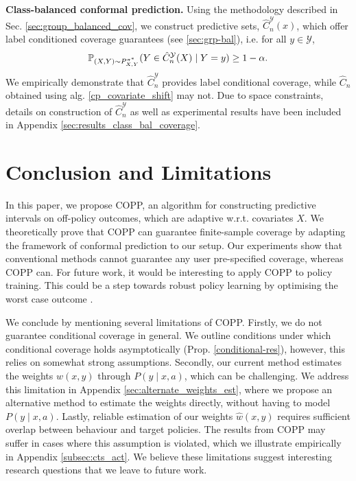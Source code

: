 
\textbf{Class-balanced conformal prediction.}
Using the methodology described in Sec. \ref{sec:group_balanced_cov}, we construct predictive sets, $\hat{C}^{\mathcal{Y}}_n(x)$, which offer label conditioned coverage guarantees (see \ref{sec:grp-bal}), i.e. for all $y\in \mathcal{Y}$, 
$$
\mathbb{P}_{(X,Y)\sim P^{\pi^*}_{X,Y}}(Y \in \hat{C}^{\mathcal{Y}}_n(X) \mid Y = y) \geq 1- \alpha.
$$
We empirically demonstrate that $\hat{C}^{\mathcal{Y}}_n$ provides label conditional coverage, while $\hat{C}_n$ obtained using alg. \ref{cp_covariate_shift} may not. Due to space constraints, details on construction of $\hat{C}^{\mathcal{Y}}_n$ as well as experimental results have been included in Appendix \ref{sec:results_class_bal_coverage}.

\section{Conclusion and Limitations}\label{sec:lims}

In this paper, we propose COPP, an algorithm for constructing predictive intervals on off-policy outcomes, which are adaptive w.r.t. covariates $X$. We theoretically prove that COPP can guarantee finite-sample coverage by adapting the framework of conformal prediction to our setup.
Our experiments show that conventional methods cannot guarantee any user pre-specified coverage, whereas COPP can.
For future work, it would be interesting to apply COPP to policy training. This could be a step towards robust policy learning by optimising the worst case outcome \citep{stutz2021learning}.

We conclude by mentioning several limitations of COPP. 
Firstly, we do not guarantee conditional coverage in general.
We outline conditions under which conditional coverage holds asymptotically (Prop. \ref{conditional-res}), however, this relies on somewhat strong assumptions.
Secondly, our current method estimates the weights $w(x, y)$ through $P(y \mid x, a)$, which can be challenging.
We address this limitation in Appendix \ref{sec:alternate_weights_est}, where we propose an alternative method to estimate the weights directly, without having to model $P(y \mid x, a)$. %
Lastly, reliable estimation of our weights $\hat{w}(x, y)$ requires sufficient overlap between behaviour and target policies. The results from COPP may suffer in cases where this assumption is violated, which we illustrate empirically in Appendix \ref{subsec:cts_act}.
We believe these limitations suggest interesting research questions that we leave to future work.

